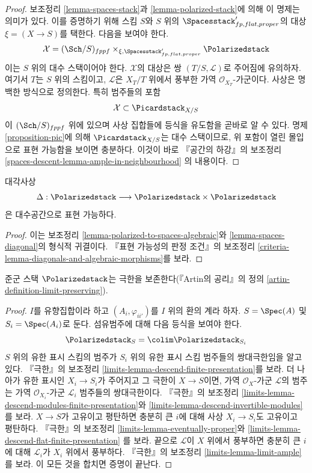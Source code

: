 \begin{proof}
보조정리 \ref{lemma-spaces-stack}과 \ref{lemma-polarized-stack}에 의해 이 명제는
의미가 있다. 이를 증명하기 위해 스킴 $S$와 $S$ 위의
$\Spacesstack'_{fp, flat, proper}$의 대상 $\xi = (X \to S)$를 택한다.
다음을 보여야 한다.
$$
\mathcal{X} = (\Sch/S)_{fppf} \times_{\xi, \Spacesstack'_{fp, flat, proper}}
\Polarizedstack
$$
이는 $S$ 위의 대수 스택이어야 한다. $\mathcal{X}$의 대상은 쌍
$(T/S, \mathcal{L})$로 주어짐에 유의하자. 여기서 $T$는 $S$ 위의 스킴이고,
$\mathcal{L}$은 $X_T/T$ 위에서 풍부한 가역 $\mathcal{O}_{X_T}$-가군이다.
사상은 명백한 방식으로 정의한다. 특히 범주들의 포함
$$
\mathcal{X} \subset \Picardstack_{X/S}
$$
이 $(\Sch/S)_{fppf}$ 위에 있으며 사상 집합들에 등식을 유도함을 곧바로
알 수 있다. 명제 \ref{proposition-pic}에 의해 $\Picardstack_{X/S}$는
대수 스택이므로, 위 포함이 열린 몰입으로 표현 가능함을 보이면 충분하다.
이것이 바로 『공간의 하강』의 보조정리
\ref{spaces-descent-lemma-ample-in-neighbourhood}
의 내용이다.
\end{proof}

\begin{lemma}
\label{lemma-polarized-diagonal}
대각사상
$$
\Delta : \Polarizedstack \longrightarrow
\Polarizedstack \times \Polarizedstack
$$
은 대수공간으로 표현 가능하다.
\end{lemma}

\begin{proof}
이는 보조정리 \ref{lemma-polarized-to-spaces-algebraic}와
\ref{lemma-spaces-diagonal}의 형식적 귀결이다. 『표현 가능성의 판정 조건』의
보조정리 \ref{criteria-lemma-diagonals-and-algebraic-morphisms}를 보라.
\end{proof}

\begin{lemma}
\label{lemma-polarized-limits}
준군 스택 $\Polarizedstack$는 극한을 보존한다(『Artin의 공리』의 정의
\ref{artin-definition-limit-preserving}).
\end{lemma}

\begin{proof}
$I$를 유향집합이라 하고 $(A_i, \varphi_{ii'})$를 $I$ 위의 환의 계라 하자.
$S = \Spec(A)$ 및 $S_i = \Spec(A_i)$로 둔다. 섬유범주에 대해 다음 등식을
보여야 한다.
$$
\Polarizedstack_S = \colim \Polarizedstack_{S_i}
$$
$S$ 위의 유한 표시 스킴의 범주가 $S_i$ 위의 유한 표시 스킴 범주들의
쌍대극한임을 알고 있다. 『극한』의 보조정리
\ref{limits-lemma-descend-finite-presentation}를 보라. 더 나아가 유한 표시인
$X_i \to S_i$가 주어지고 그 극한이 $X \to S$이면, 가역
$\mathcal{O}_X$-가군 $\mathcal{L}$의 범주는 가역 $\mathcal{O}_{X_i}$-가군
$\mathcal{L}_i$ 범주들의 쌍대극한이다. 『극한』의 보조정리
\ref{limits-lemma-descend-modules-finite-presentation}와
\ref{limits-lemma-descend-invertible-modules}
를 보라. $X \to S$가 고유이고 평탄하면 충분히 큰 $i$에 대해 사상
$X_i \to S_i$도 고유이고 평탄하다. 『극한』의 보조정리
\ref{limits-lemma-eventually-proper}와
\ref{limits-lemma-descend-flat-finite-presentation}
를 보라. 끝으로 $\mathcal{L}$이 $X$ 위에서 풍부하면 충분히 큰 $i$에 대해
$\mathcal{L}_i$가 $X_i$ 위에서 풍부하다. 『극한』의 보조정리
\ref{limits-lemma-limit-ample}를 보라. 이 모든 것을 합치면 증명이 끝난다.
\end{proof}


